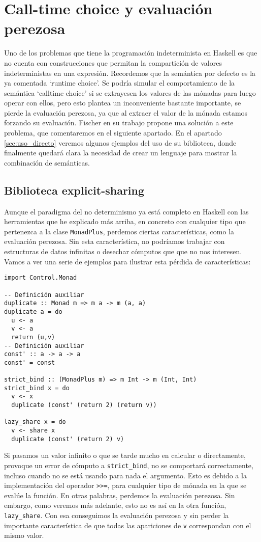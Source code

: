 \documentclass[class=article, crop=false]{standalone}
\begin{document}
\section{Call-time choice y evaluación perezosa}
Uno de los problemas que tiene la programación indeterminista en Haskell es que no cuenta con
construcciones que permitan la compartición de valores indeterministas en una expresión.
Recordemos que la semántica por defecto es la ya comentada `runtime choice'. Se podría
simular el comportamiento de la semántica `calltime choice' si se extrayesen los valores de
las mónadas para luego operar con ellos, pero esto plantea un inconveniente bastante
importante, se pierde la evaluación perezosa, ya que al extraer el valor de la mónada estamos
forzando su evaluación. Fischer en su trabajo propone una solución a este problema, que
comentaremos en el siguiente apartado. En el apartado \ref{sec:uso_directo} veremos algunos
ejemplos del uso de su biblioteca, donde finalmente quedará clara la necesidad de crear un
lenguaje para mostrar la combinación de semánticas.

\subsection{Biblioteca explicit-sharing}\label{sec:explicit_sharing}
Aunque el paradigma del no determinismo ya está completo en Haskell con las herramientas que
he explicado más arriba, en concreto con cualquier tipo que pertenezca a la clase
\verb`MonadPlus`, perdemos ciertas características, como la evaluación perezosa. Sin esta
característica, no podríamos trabajar con estructuras de datos infinitas o desechar cómputos
que que no nos interesen. Vamos a ver una serie de ejemplos para ilustrar esta pérdida de
características\cite{fischer2011purely}:

\begin{verbatim}
import Control.Monad

-- Definición auxiliar
duplicate :: Monad m => m a -> m (a, a)
duplicate a = do
  u <- a
  v <- a
  return (u,v)
-- Definición auxiliar
const' :: a -> a -> a
const' = const

strict_bind :: (MonadPlus m) => m Int -> m (Int, Int)
strict_bind x = do
  v <- x
  duplicate (const' (return 2) (return v))

lazy_share x = do
  v <- share x
  duplicate (const' (return 2) v)
\end{verbatim}

Si pasamos un valor infinito o que se tarde mucho en calcular o directamente, provoque un
error de cómputo a \verb`strict_bind`, no se comportará correctamente, incluso cuando no se
está usando para nada el argumento. Esto es debido a la implementación del operador
\verb`>>=`, para cualquier tipo de mónada en la que se evalúe la función. En otras palabras,
perdemos la evaluación perezosa. Sin embargo, como veremos más adelante, esto no es así en
la otra función, \verb`lazy_share`. Con esa conseguimos la evaluación perezosa y sin perder
la importante característica de que todas las apariciones de \verb`v` correspondan con el
mismo valor.
\newpage
\end{document}
